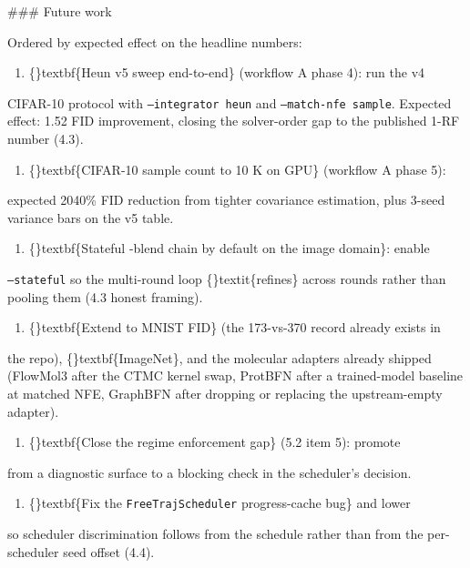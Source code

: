\documentclass{article}
\begin{document}
\#\#\# Future work

Ordered by expected effect on the headline numbers:

\begin{enumerate}
\item \{\}textbf\{Heun v5 sweep end-to-end\} (workflow A phase 4): run the v4
\end{enumerate}
CIFAR-10 protocol with \texttt{--integrator heun} and \texttt{--match-nfe sample}. Expected effect: 1.52 FID improvement, closing the solver-order gap to the published 1-RF number (4.3).

\begin{enumerate}
\item \{\}textbf\{CIFAR-10 sample count to 10 K on GPU\} (workflow A phase 5):
\end{enumerate}
expected 2040\% FID reduction from tighter covariance estimation, plus 3-seed variance bars on the v5 table.

\begin{enumerate}
\item \{\}textbf\{Stateful -blend chain by default on the image domain\}: enable
\end{enumerate}
\texttt{--stateful} so the multi-round loop \{\}textit\{refines\} across rounds rather than pooling them (4.3 honest framing).

\begin{enumerate}
\item \{\}textbf\{Extend to MNIST FID\} (the 173-vs-370 record already exists in
\end{enumerate}
the repo), \{\}textbf\{ImageNet\}, and the molecular adapters already shipped (FlowMol3 after the CTMC kernel swap, ProtBFN after a trained-model baseline at matched NFE, GraphBFN after dropping or replacing the upstream-empty adapter).

\begin{enumerate}
\item \{\}textbf\{Close the  regime enforcement gap\} (5.2 item 5): promote
\end{enumerate}
 from a diagnostic surface to a blocking check in the scheduler's  decision.

\begin{enumerate}
\item \{\}textbf\{Fix the \texttt{FreeTrajScheduler} progress-cache bug\} and lower
\end{enumerate}
 so scheduler discrimination follows from the schedule rather than from the per-scheduler seed offset (4.4).
\end{document}
